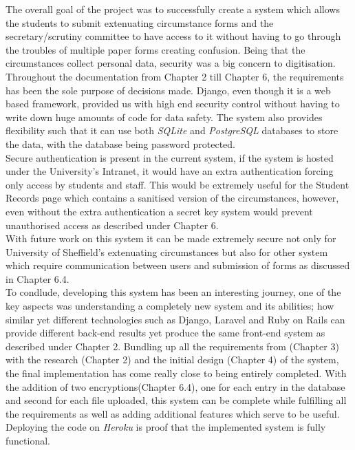 \documentclass[../main.tex]{subfiles}
\begin{document}
\raggedright
The overall goal of the project was to successfully create a system which allows the students to submit extenuating circumstance forms and the secretary/scrutiny committee to have access to it without having to go through the troubles of multiple paper forms creating confusion. Being that the circumstances collect personal data, security was a big concern to digitisation. Throughout the documentation from Chapter 2 till Chapter 6, the requirements has been the sole purpose of decisions made. Django, even though it is a web based framework, provided us with high end security control without having to write down huge amounts of code for data safety. The system also provides flexibility such that it can use both \textit{SQLite} and \textit{PostgreSQL} databases to store the data, with the database being password protected. \\[4mm]

Secure authentication is present in the current system, if the system is hosted under the University's Intranet, it would have an extra authentication forcing only access by students and staff. This would be extremely useful for the Student Records page which contains a sanitised version of the circumstances, however, even without the extra authentication a secret key system would prevent unauthorised access as described under Chapter 6. \\[4mm]

With future work on this system it can be made extremely secure not only for University of Sheffield's extenuating circumstances but also for other system which require communication between users and submission of forms as discussed in Chapter 6.4. \\[4mm]

To condlude, developing this system has been an interesting journey, one of the key aspects was understanding a completely new system and its abilities; how similar yet different technologies such as Django, Laravel and Ruby on Rails can provide different back-end results yet produce the same front-end system as described under Chapter 2. Bundling up all the requirements from (Chapter 3) with the research (Chapter 2) and the initial design (Chapter 4) of the system, the final implementation has come really close to being entirely completed. With the addition of two encryptions(Chapter 6.4), one for each entry in the database and second for each file uploaded, this system can be complete while fulfilling all the requirements as well as adding additional features which serve to be useful. Deploying the code on \textit{Heroku} is proof that the implemented system is fully functional.
\end{document}
